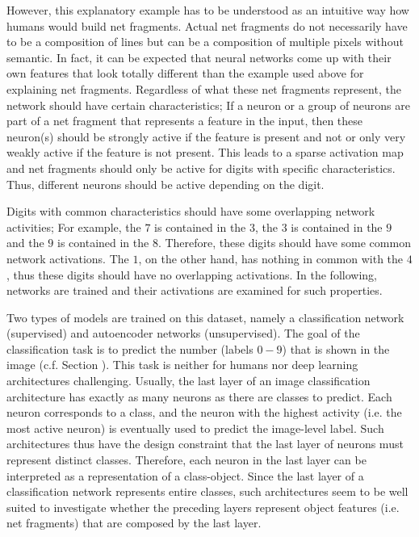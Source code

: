 However, this explanatory example has to be understood as an intuitive way how humans would build net fragments.
Actual net fragments do not necessarily have to be a composition of lines but can be a composition of multiple pixels without semantic.
In fact, it can be expected that neural networks come up with their own features that look totally different than the example used above for explaining net fragments.
Regardless of what these net fragments represent, the network should have certain characteristics;
If a neuron or a group of neurons are part of a net fragment that represents a feature in the input, then these neuron(s) should be strongly active if the feature is present and not or only very weakly active if the feature is not present.
This leads to a sparse activation map and net fragments should only be active for digits with specific characteristics.
Thus, different neurons should be active depending on the digit.

Digits with common characteristics should have some overlapping network activities;
For example, the $7$ is contained in the $3$, the $3$ is contained in the $9$ and the $9$ is contained in the $8$.
Therefore, these digits should have some common network activations.
The $1$, on the other hand, has nothing in common with the $4$, thus these digits should have no overlapping activations.
In the following, networks are trained and their activations are examined for such properties.

Two types of models are trained on this dataset, namely a classification network (supervised) and autoencoder networks (unsupervised).
The goal of the classification task is to predict the number (labels $0-9$) that is shown in the image (c.f. Section ).
This task is neither for humans nor deep learning architectures challenging.
Usually, the last layer of an image classification architecture has exactly as many neurons as there are classes to predict.
Each neuron corresponds to a class, and the neuron with the highest activity (i.e. the most active neuron) is eventually used to predict the image-level label.
Such architectures thus have the design constraint that the last layer of neurons must represent distinct classes.
Therefore, each neuron in the last layer can be interpreted as a representation of a class-object.
Since the last layer of a classification network represents entire classes, such architectures seem to be well suited to investigate whether the preceding layers represent object features (i.e. net fragments) that are composed by the last layer.

